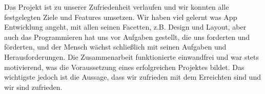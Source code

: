 Das Projekt ist zu unserer Zufriedenheit verlaufen und wir konnten alle
festgelegten Ziele und Features umsetzen. Wir haben viel gelernt was App
Entwicklung angeht, mit allen seinen Facetten, z.B. Design und Layout, aber auch
das Programmieren hat uns vor Aufgaben gestellt, die uns forderten und
förderten, und der Mensch wächst schließlich mit seinen Aufgaben und
Herausforderungen. Die Zusammenarbeit funktionierte einwandfrei und war stets
motivierend, was die Voraussetzung eines erfolgreichen Projektes bildet. Das
wichtigste jedoch ist die Aussage, dass wir zufrieden mit dem Erreichten sind
und wir sind zufrieden.


\appendix
\printbibliography[heading=bibintoc,title={Quellenverzeichnis}]
\listoffigures


